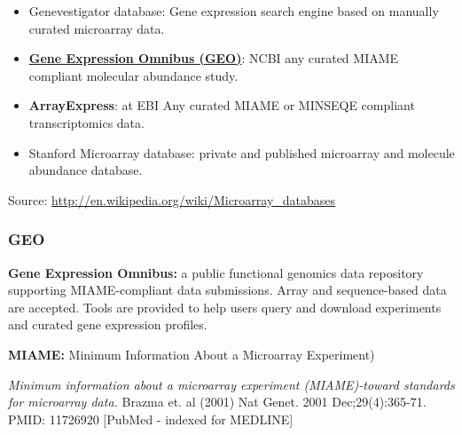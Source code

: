 \documentclass{beamer}
\begin{document}
\begin{frame}[allowframebreaks]
\begin{itemize}
    \framebreak

  \item Genevestigator database: Gene expression search engine based on manually curated microarray data.
  \item \href{http://www.ncbi.nlm.nih.gov/geo/}{\textbf{Gene Expression Omnibus (GEO)}}: NCBI any curated MIAME compliant molecular abundance study.
  \item \textbf{ArrayExpress}: at EBI Any curated MIAME or MINSEQE compliant transcriptomics data.
  \item Stanford Microarray database: private and published microarray and molecule abundance database.
  \end{itemize}

  \bigskip
  {\footnotesize Source: \url{http://en.wikipedia.org/wiki/Microarray_databases}}

\end{frame}


\begin{frame}
  \frametitle{GEO}

  \textbf{Gene Expression Omnibus:} a public functional genomics data repository supporting MIAME-compliant data submissions. 
  Array and sequence-based data are accepted. Tools are provided to help users query and download experiments and curated gene expression profiles.

  \bigskip
  
  \textbf{MIAME:} Minimum Information About a Microarray Experiment)

  \bigskip

  \textit{Minimum information about a microarray experiment (MIAME)-toward standards for microarray data.}
  Brazma et. al (2001) 
  Nat Genet. 2001 Dec;29(4):365-71.
  PMID: 11726920 [PubMed - indexed for MEDLINE] 
  
\end{frame}

\end{document}
